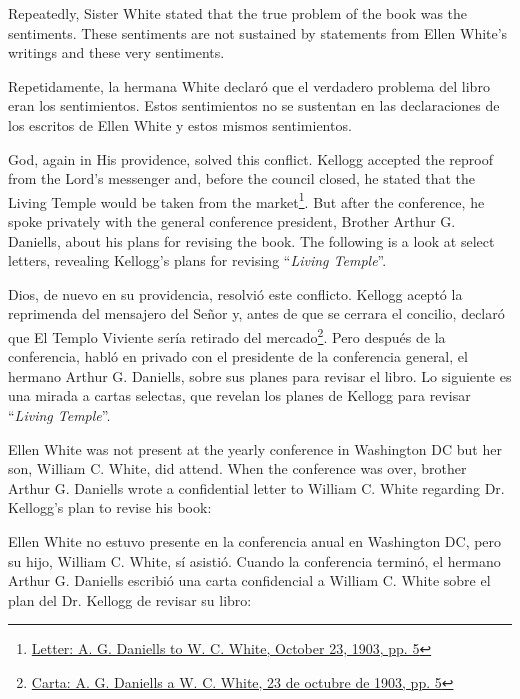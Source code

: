 Repeatedly, Sister White stated that the true problem of the book was the sentiments. These sentiments are not sustained by statements from Ellen White's writings and these very sentiments.


Repetidamente, la hermana White declaró que el verdadero problema del libro eran los sentimientos. Estos sentimientos no se sustentan en las declaraciones de los escritos de Ellen White y estos mismos sentimientos.


God, again in His providence, solved this conflict. Kellogg accepted the reproof from the Lord's messenger and, before the council closed, he stated that the Living Temple would be taken from the market\footnote{\href{https://forgottenpillar.com/wp-content/uploads/2022/04/Letter-A-G-Daniells-to-W-C-White-October-29-1903.pdf}{Letter: A. G. Daniells to W. C. White, October 23, 1903, pp. 5}}. But after the conference, he spoke privately with the general conference president, Brother Arthur G. Daniells, about his plans for revising the book. The following is a look at select letters, revealing Kellogg's plans for revising “\textit{Living Temple}”.


Dios, de nuevo en su providencia, resolvió este conflicto. Kellogg aceptó la reprimenda del mensajero del Señor y, antes de que se cerrara el concilio, declaró que El Templo Viviente sería retirado del mercado\footnote{\href{https://forgottenpillar.com/wp-content/uploads/2022/04/Letter-A-G-Daniells-to-W-C-White-October-29-1903.pdf}{Carta: A. G. Daniells a W. C. White, 23 de octubre de 1903, pp. 5}}. Pero después de la conferencia, habló en privado con el presidente de la conferencia general, el hermano Arthur G. Daniells, sobre sus planes para revisar el libro. Lo siguiente es una mirada a cartas selectas, que revelan los planes de Kellogg para revisar “\textit{Living Temple}”.


Ellen White was not present at the yearly conference in Washington DC but her son, William C. White, did attend. When the conference was over, brother Arthur G. Daniells wrote a confidential letter to William C. White regarding Dr. Kellogg's plan to revise his book:


Ellen White no estuvo presente en la conferencia anual en Washington DC, pero su hijo, William C. White, sí asistió. Cuando la conferencia terminó, el hermano Arthur G. Daniells escribió una carta confidencial a William C. White sobre el plan del Dr. Kellogg de revisar su libro:


